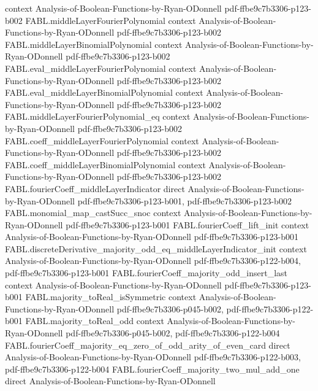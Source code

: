 \begin{theorem}
  {context}
  {Analysis-of-Boolean-Functions-by-Ryan-ODonnell}
  {pdf-ffbe9c7b3306-p123-b002}
\proofstep
  {FABL.middleLayerFourierPolynomial}
  {context}
  {Analysis-of-Boolean-Functions-by-Ryan-ODonnell}
  {pdf-ffbe9c7b3306-p123-b002}
\proofstep
  {FABL.middleLayerBinomialPolynomial}
  {context}
  {Analysis-of-Boolean-Functions-by-Ryan-ODonnell}
  {pdf-ffbe9c7b3306-p123-b002}
\proofstep
  {FABL.eval_middleLayerFourierPolynomial}
  {context}
  {Analysis-of-Boolean-Functions-by-Ryan-ODonnell}
  {pdf-ffbe9c7b3306-p123-b002}
\proofstep
  {FABL.eval_middleLayerBinomialPolynomial}
  {context}
  {Analysis-of-Boolean-Functions-by-Ryan-ODonnell}
  {pdf-ffbe9c7b3306-p123-b002}
\proofstep
  {FABL.middleLayerFourierPolynomial_eq}
  {context}
  {Analysis-of-Boolean-Functions-by-Ryan-ODonnell}
  {pdf-ffbe9c7b3306-p123-b002}
\proofstep
  {FABL.coeff_middleLayerFourierPolynomial}
  {context}
  {Analysis-of-Boolean-Functions-by-Ryan-ODonnell}
  {pdf-ffbe9c7b3306-p123-b002}
\proofstep
  {FABL.coeff_middleLayerBinomialPolynomial}
  {context}
  {Analysis-of-Boolean-Functions-by-Ryan-ODonnell}
  {pdf-ffbe9c7b3306-p123-b002}
\proofstep
  {FABL.fourierCoeff_middleLayerIndicator}
  {direct}
  {Analysis-of-Boolean-Functions-by-Ryan-ODonnell}
  {pdf-ffbe9c7b3306-p123-b001,
    pdf-ffbe9c7b3306-p123-b002}
\proofstep
  {FABL.monomial_map_castSucc_snoc}
  {context}
  {Analysis-of-Boolean-Functions-by-Ryan-ODonnell}
  {pdf-ffbe9c7b3306-p123-b001}
\proofstep
  {FABL.fourierCoeff_lift_init}
  {context}
  {Analysis-of-Boolean-Functions-by-Ryan-ODonnell}
  {pdf-ffbe9c7b3306-p123-b001}
\proofstep
  {FABL.discreteDerivative_majority_odd_eq_middleLayerIndicator_init}
  {context}
  {Analysis-of-Boolean-Functions-by-Ryan-ODonnell}
  {pdf-ffbe9c7b3306-p122-b004,
    pdf-ffbe9c7b3306-p123-b001}
\proofstep
  {FABL.fourierCoeff_majority_odd_insert_last}
  {context}
  {Analysis-of-Boolean-Functions-by-Ryan-ODonnell}
  {pdf-ffbe9c7b3306-p123-b001}
\proofstep
  {FABL.majority_toReal_isSymmetric}
  {context}
  {Analysis-of-Boolean-Functions-by-Ryan-ODonnell}
  {pdf-ffbe9c7b3306-p045-b002,
    pdf-ffbe9c7b3306-p122-b001}
\proofstep
  {FABL.majority_toReal_odd}
  {context}
  {Analysis-of-Boolean-Functions-by-Ryan-ODonnell}
  {pdf-ffbe9c7b3306-p045-b002,
    pdf-ffbe9c7b3306-p122-b004}
\proofstep
  {FABL.fourierCoeff_majority_eq_zero_of_odd_arity_of_even_card}
  {direct}
  {Analysis-of-Boolean-Functions-by-Ryan-ODonnell}
  {pdf-ffbe9c7b3306-p122-b003,
    pdf-ffbe9c7b3306-p122-b004}
\proofstep
  {FABL.fourierCoeff_majority_two_mul_add_one}
  {direct}
  {Analysis-of-Boolean-Functions-by-Ryan-ODonnell}

\end{theorem}

